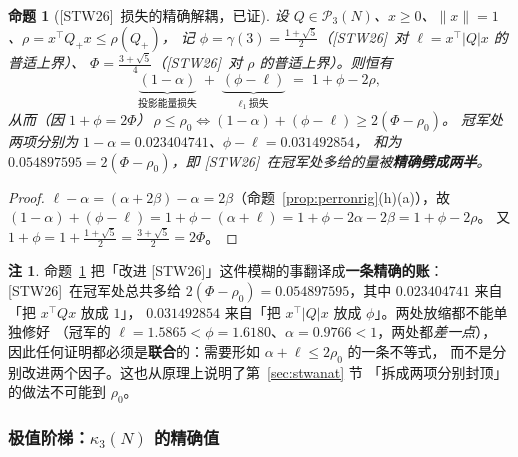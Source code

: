 \documentclass[UTF8,11pt]{ctexart}
\newtheorem{proposition}[theorem]{命题}
\theoremstyle{definition}
\newtheorem{remark}[theorem]{注}
\newcommand{\STW}{\textup{[STW26]}}
\begin{document}
\begin{proposition}[\STW\ 损失的精确解耦，已证]\label{prop:decouple}
设 $Q\in\mathcal P_3(N)$、$x\ge0$、$\|x\|=1$、$\rho=x^\top Q_+x\le\rho(Q_+)$，
记 $\phi=\gamma(3)=\frac{1+\sqrt5}{2}$（\STW\ 对 $\ell=x^\top|Q|x$ 的普适上界）、
$\Phi=\frac{3+\sqrt5}{4}$（\STW\ 对 $\rho$ 的普适上界）。则恒有
\[
\underbrace{(1-\alpha)}_{\text{投影能量损失}}\;+\;
\underbrace{(\phi-\ell)}_{\ell_1\ \text{损失}}\;=\;1+\phi-2\rho ,
\]
从而（因 $1+\phi=2\Phi$）$\ \rho\le\rho_0\iff(1-\alpha)+(\phi-\ell)\ge2(\Phi-\rho_0)$。
冠军处两项分别为 $1-\alpha=0.023404741$、$\phi-\ell=0.031492854$，
和为 $0.054897595=2(\Phi-\rho_0)$，即 \STW\ 在冠军处多给的量被\textbf{精确劈成两半}。
\end{proposition}

\begin{proof}
$\ell-\alpha=(\alpha+2\beta)-\alpha=2\beta$（命题~\ref{prop:perronrig}(h)(a)），故
$(1-\alpha)+(\phi-\ell)=1+\phi-(\alpha+\ell)=1+\phi-2\alpha-2\beta=1+\phi-2\rho$。
又 $1+\phi=1+\frac{1+\sqrt5}{2}=\frac{3+\sqrt5}{2}=2\Phi$。\qedhere
\end{proof}

\begin{remark}
命题~\ref{prop:decouple} 把「改进 \STW」这件模糊的事翻译成\textbf{一条精确的账}：
\STW\ 在冠军处总共多给 $2(\Phi-\rho_0)=0.054897595$，其中 $0.023404741$ 来自「把 $x^\top Qx$ 放成 $1$」，
$0.031492854$ 来自「把 $x^\top|Q|x$ 放成 $\phi$」。两处放缩都不能单独修好
（冠军的 $\ell=1.5865<\phi=1.6180$、$\alpha=0.9766<1$，两处都\emph{差一点}），
因此任何证明都必须是\textbf{联合}的：需要形如 $\alpha+\ell\le2\rho_0$ 的一条不等式，
而不是分别改进两个因子。这也从原理上说明了第~\ref{sec:stwanat} 节
「拆成两项分别封顶」的做法不可能到 $\rho_0$。
\end{remark}

\subsubsection{极值阶梯：$\kappa_3(N)$ 的精确值}\label{sec:ladder}
\end{document}
